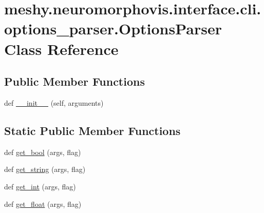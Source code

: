 \hypertarget{classmeshy_1_1neuromorphovis_1_1interface_1_1cli_1_1options__parser_1_1OptionsParser}{}\section{meshy.\+neuromorphovis.\+interface.\+cli.\+options\+\_\+parser.\+Options\+Parser Class Reference}
\label{classmeshy_1_1neuromorphovis_1_1interface_1_1cli_1_1options__parser_1_1OptionsParser}


 


\subsection*{Public Member Functions}
\begin{DoxyCompactItemize}
\item 
def \hyperlink{classmeshy_1_1neuromorphovis_1_1interface_1_1cli_1_1options__parser_1_1OptionsParser_ad4de5e70f118693602173e739d063895}{\+\_\+\+\_\+init\+\_\+\+\_\+} (self, arguments)
\end{DoxyCompactItemize}
\subsection*{Static Public Member Functions}
\begin{DoxyCompactItemize}
\item 
def \hyperlink{classmeshy_1_1neuromorphovis_1_1interface_1_1cli_1_1options__parser_1_1OptionsParser_a20e0c32385d848fcf150f413d90a169c}{get\+\_\+bool} (args, flag)
\item 
def \hyperlink{classmeshy_1_1neuromorphovis_1_1interface_1_1cli_1_1options__parser_1_1OptionsParser_a62e9573b12b47f87fc3d21ff9c6882d6}{get\+\_\+string} (args, flag)
\item 
def \hyperlink{classmeshy_1_1neuromorphovis_1_1interface_1_1cli_1_1options__parser_1_1OptionsParser_a0feaa574b03ff5036f5ed0634bd3bfd1}{get\+\_\+int} (args, flag)
\item 
def \hyperlink{classmeshy_1_1neuromorphovis_1_1interface_1_1cli_1_1options__parser_1_1OptionsParser_a92f117c2f0a3fb72cdc059472ef6c951}{get\+\_\+float} (args, flag)
\end{DoxyCompactItemize}

